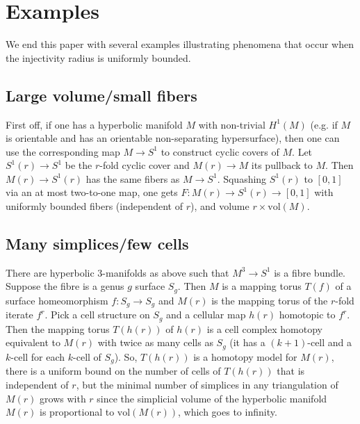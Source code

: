 \documentclass[11pt,letterpaper]{amsart}
\begin{document}
\section{Examples}
We end this paper with several examples illustrating phenomena that occur when the injectivity radius is uniformly bounded. %

\subsection{Large volume/small fibers\label{largevol}} First off, if one has a hyperbolic manifold $M$ with non-trivial $H^1(M)$ (e.g. if $M$ is orientable and has an orientable non-separating hypersurface), then one can use the corresponding map $M\rightarrow S^1$ to construct cyclic covers of $M$. Let $S^1(r)\rightarrow S^1$ be the $r$-fold cyclic cover and $M(r)\rightarrow M$ its pullback to $M$. Then $M(r)\rightarrow S^1(r)$ has the same fibers as $M\rightarrow S^1$. Squashing $S^1(r)$ to $[0,1]$ via an at most two-to-one map, one gets $F:M(r)\rightarrow S^1(r)\rightarrow [0,1]$ with uniformly bounded fibers (independent of $r$), and volume $r \times \mbox{vol}(M)$. 
\subsection{Many simplices/few cells\label{simpvscell}} There are hyperbolic $3$-manifolds as above such that $M^3\rightarrow S^1$ is a fibre bundle. Suppose the fibre is a genus $g$ surface $S_g$. Then $M$ is a mapping torus $T(f)$ of a surface homeomorphism $f:S_g\rightarrow S_g$ and $M(r)$ is the mapping torus of the $r$-fold iterate $f^r$. Pick a cell structure on $S_g$ and a cellular map $h(r)$ homotopic to $f^r$. Then the mapping torus $T(h(r))$ of $h(r)$ is a cell complex homotopy equivalent to $M(r)$ with twice as many cells as $S_g$ (it has a $(k+1)$-cell and a $k$-cell for each $k$-cell of $S_g$). So, $T(h(r))$ is a homotopy model for $M(r)$, there is a uniform bound on the number of cells of $T(h(r))$ that is independent of $r$, 
but the minimal number of simplices in any triangulation of $M(r)$ grows with $r$ since the simplicial volume of the hyperbolic manifold $M(r)$ is proportional to $\mathrm{vol}(M(r))$, which goes to infinity.
\end{document}
